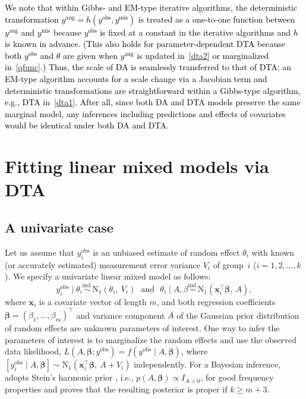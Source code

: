 \documentclass[12pt]{article}
\begin{document}
\textcolor{black}{We note that within  Gibbs- and EM-type iterative algorithms, the deterministic transformation $y^{\textrm{aug}}=h(y^{\textrm{obs}}, y^{\textrm{mis}})$ is treated as a one-to-one function  between $y^{\textrm{aug}}$ and $y^{\textrm{mis}}$ because  $y^{\textrm{obs}}$ is  fixed at a constant in the iterative algorithms and $h$ is known in advance. (This also holds for parameter-dependent DTA because both $y^{\textrm{obs}}$ and $\theta$ are given when $y^{\textrm{aug}}$ is updated  in~\eqref{dta2} or marginalized in~\eqref{qfunc}.)  Thus, the  scale of DA is seamlessly transferred to that of DTA; an EM-type algorithm  accounts for a scale change via a Jacobian term and deterministic transformations are straightforward within a Gibbs-type algorithm, e.g., DTA in~\eqref{dta1}. After all, since both DA and DTA models  preserve the same marginal model, any inferences including predictions and effects of covariates  would be identical under both DA and DTA.}


\section{Fitting linear mixed models via DTA}\label{sec3}


\subsection{A univariate case}\label{sec31}


Let us assume that $y^{\textrm{obs}}_i$ is an unbiased estimate of random effect $\theta_i$ with known (or accurately estimated) measurement error variance $V_i$ of group~$i$ ($i=1, 2, \ldots, k$). We specify a univariate linear mixed model \citep{efron1975data, kass1989approx, daniels1999prior, morris2012shrinkage} as follows:
\begin{equation}\label{equ1}
y^{\textrm{obs}}_i\mid\theta_i\stackrel{\textrm{ind.}}{\sim} \textrm{N}_1(\theta_i,~ V_i)~~~\textrm{and}~~~\theta_i\mid A, \beta \stackrel{\textrm{ind.}}{\sim} \textrm{N}_1(\boldsymbol{x}_i^{\top}\boldsymbol{\beta},~ A),
\end{equation}
where $\boldsymbol{x}_i$ is a covariate vector of length $m$, and both  regression coefficients $\boldsymbol{\beta}=(\beta_1, \ldots, \beta_m)^{\top}$ and variance component $A$ of the Gaussian prior distribution of random effects are  unknown  parameters of interest. One way to infer the parameters of interest is to marginalize the random effects and use the  observed data likelihood, $L(A, \boldsymbol{\beta}; y^{\textrm{obs}})=f(y^{\textrm{obs}}\mid A, \boldsymbol{\beta})$, where $[y^{\textrm{obs}}_i\mid A, \boldsymbol{\beta}]\sim \textrm{N}_1(\boldsymbol{x}^{\top}_i\boldsymbol{\beta},~ A+V_i)$ independently.  For a  Bayesian inference, \cite{kelly2014advances} adopts Stein's harmonic prior \textcolor{black}{\citep{morris2012shrinkage}}, i.e., $p(A, \boldsymbol{\beta})\propto I_{A>0}$, for good frequency properties  and proves that the resulting posterior is proper if $k\ge m+3$. 
\end{document}
